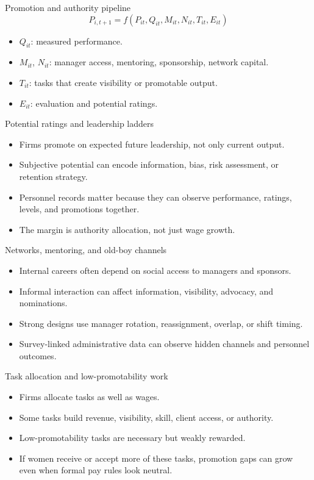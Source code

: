 \documentclass[aspectratio=169,11pt]{beamer}
\begin{document}
\begin{frame}{Promotion and authority pipeline}
\[
P_{i,t+1}=f(P_{it},Q_{it},M_{it},N_{it},T_{it},E_{it})
\]
\begin{itemize}
    \item \(Q_{it}\): measured performance.
    \item \(M_{it}\), \(N_{it}\): manager access, mentoring, sponsorship, network capital.
    \item \(T_{it}\): tasks that create visibility or promotable output.
    \item \(E_{it}\): evaluation and potential ratings.
\end{itemize}
\end{frame}

\begin{frame}{Potential ratings and leadership ladders}
\begin{itemize}
    \item Firms promote on expected future leadership, not only current output.
    \item Subjective potential can encode information, bias, risk assessment, or retention strategy.
    \item Personnel records matter because they can observe performance, ratings, levels, and promotions together.
    \item The margin is authority allocation, not just wage growth.
\end{itemize}
\end{frame}

\begin{frame}{Networks, mentoring, and old-boy channels}
\begin{itemize}
    \item Internal careers often depend on social access to managers and sponsors.
    \item Informal interaction can affect information, visibility, advocacy, and nominations.
    \item Strong designs use manager rotation, reassignment, overlap, or shift timing.
    \item Survey-linked administrative data can observe hidden channels and personnel outcomes.
\end{itemize}
\end{frame}

\begin{frame}{Task allocation and low-promotability work}
\begin{itemize}
    \item Firms allocate tasks as well as wages.
    \item Some tasks build revenue, visibility, skill, client access, or authority.
    \item Low-promotability tasks are necessary but weakly rewarded.
    \item If women receive or accept more of these tasks, promotion gaps can grow even when formal pay rules look neutral.
\end{itemize}
\end{frame}
\end{document}
